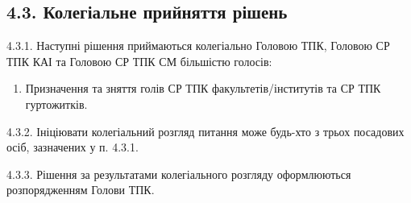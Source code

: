 \subsection*{4.3. Колегіальне прийняття рішень}
    4.3.1. Наступні рішення приймаються колегіально Головою ТПК, Головою СР ТПК КАІ та Головою СР ТПК СМ більшістю голосів:

        \begin{enumerate}[label=\alph*)]
            \item Призначення та зняття голів СР ТПК факультетів/інститутів та СР ТПК гуртожитків.
        \end{enumerate}

    4.3.2. Ініціювати колегіальний розгляд питання може будь-хто з трьох посадових осіб, зазначених у п. 4.3.1.

    4.3.3. Рішення за результатами колегіального розгляду оформлюються розпорядженням Голови ТПК.
